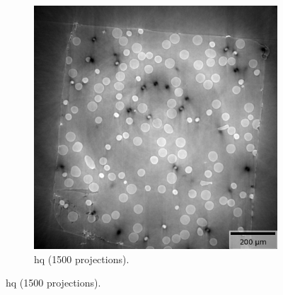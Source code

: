 \begin{figure}
  \begin{subfigure}[t]{\textwidth}
    \centering
    \includegraphics[width=.45\textwidth]{figures/gt32.png}
    \caption{\Gls{hq} (1500 projections). }
  \end{subfigure}

  \medskip


\end{figure}
